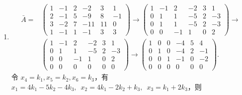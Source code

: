 \begin{enumerate}
    \item \begin{align*}
              \bar{A} ={} &
              \begin{pmatrix}
                  1 & -1 & 2 & -2  & 3  & 1  \\
                  2 & -1 & 5 & -9  & 8  & -1 \\
                  3 & -2 & 7 & -11 & 11 & 0  \\
                  1 & -1 & 1 & -1  & 3  & 3
              \end{pmatrix}
              \rightarrow
              \begin{pmatrix}
                  1 & -1 & 2  & -2 & 3 & 1  \\
                  0 & 1  & 1  & -5 & 2 & -3 \\
                  0 & 1  & 1  & -5 & 2 & -3 \\
                  0 & 0  & -1 & 1  & 0 & 2
              \end{pmatrix} \rightarrow \\
                          &
              \begin{pmatrix}
                  1 & -1 & 2  & -2 & 3 & 1  \\
                  0 & 1  & 1  & -5 & 2 & -3 \\
                  0 & 0  & -1 & 1  & 0 & 2  \\
                  0 & 0  & 0  & 0  & 0 & 0
              \end{pmatrix}
              \rightarrow
              \begin{pmatrix}
                  1 & 0 & 0 & -4 & 5 & 4  \\
                  0 & 1 & 0 & -4 & 2 & -1  \\
                  0 & 0 & 1 & -1 & 0 & -2 \\
                  0 & 0 & 0 & 0  & 0 & 0
              \end{pmatrix}.
          \end{align*}
          令 $ x_4 = k_1, x_5 = k_2, x_6 = k_3$，有 $x_1 = 4k_1 - 5k_2 - 4k_3,\enspace\allowbreak x_2 = 4k_1 - 2k_2 + k_3,\enspace\allowbreak x_3 = k_1 + 2k_3 $，则

\end{enumerate}
